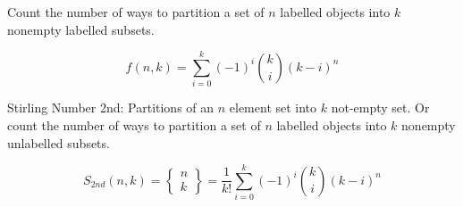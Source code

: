 Count the number of ways to partition a set of $n$ labelled objects into $k$ nonempty labelled subsets.

$$f(n, k) = \sum_{i=0}^{k}(-1)^i\binom{k}{i}(k-i)^n$$

Stirling Number 2nd: Partitions of an $n$ element set into $k$ not-empty set. Or count the number of ways to partition a set of $n$ labelled objects into $k$ nonempty unlabelled subsets.

$$S_{2nd}(n, k) = \begin{Bmatrix} n \\ k \end{Bmatrix} = \frac{1}{k!}\sum_{i=0}^{k}(-1)^i\binom{k}{i}(k-i)^n$$